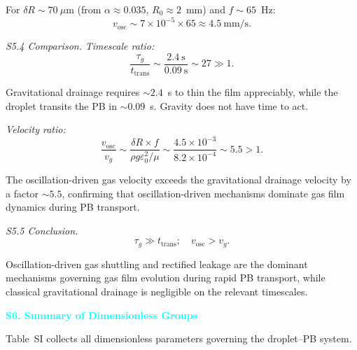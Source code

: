 \documentclass[%
 preprint,
 superscriptaddress,
 amsmath,amssymb,
 aps, prl,
]{revtex4-2}
\begin{document}
For $\delta R \sim 70~\mu$m (from $\alpha \approx 0.035$, $R_0 \approx 2$~mm) and $f \sim 65$~Hz:
\begin{equation}
v_{\text{osc}} \sim 7\times10^{-5} \times 65 \approx 4.5~\text{mm/s}.
\label{eq:s5_vosc_num}
\end{equation}

{\noindent\textit{S5.4 Comparison.}}
\textit{Timescale ratio:}
\begin{equation}
\frac{\tau_g}{t_{\text{trans}}}
\sim \frac{2.4~\text{s}}{0.09~\text{s}}
\sim 27 \gg 1.
\label{eq:s5_timescale_ratio}
\end{equation}

Gravitational drainage requires $\sim 2.4$~s to thin the film appreciably, while the droplet transits the PB in $\sim 0.09$~s. Gravity does not have time to act.\par

\textit{Velocity ratio:}
\begin{equation}
\frac{v_{\text{osc}}}{v_g}
\sim \frac{\delta R \times f}{\rho g \varepsilon_0^2/\mu}
\sim \frac{4.5\times10^{-3}}{8.2\times10^{-4}}
\sim 5.5 > 1.
\label{eq:s5_velocity_ratio}
\end{equation}

The oscillation-driven gas velocity exceeds the gravitational drainage velocity by a factor $\sim 5.5$, confirming that oscillation-driven mechanisms dominate gas film dynamics during PB transport.\par

{\noindent\textit{S5.5 Conclusion.}}
\begin{equation}
\boxed{\tau_g \gg t_{\text{trans}};\quad v_{\text{osc}} > v_g.}
\end{equation}

Oscillation-driven gas shuttling and rectified leakage are the dominant mechanisms governing gas film evolution during rapid PB transport, while classical gravitational drainage is negligible on the relevant timescales.\par

\textcolor{cyan}{\textbf{S6. Summary of Dimensionless Groups}}\par

Table~SI collects all dimensionless parameters governing the droplet--PB system.
\end{document}
